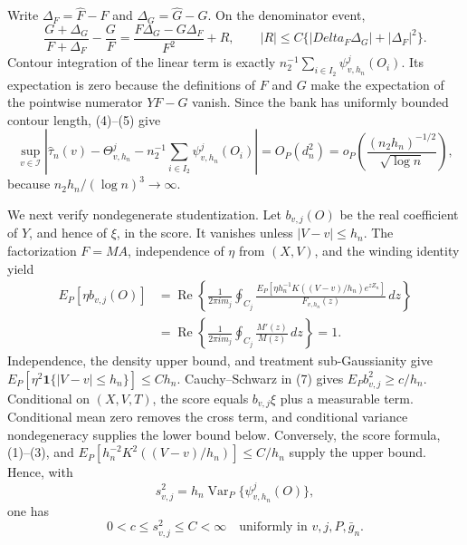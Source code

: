 Write \(\Delta_F=\widehat F-F\) and \(\Delta_G=\widehat G-G\).  On the denominator event,
\[
 \frac{G+\Delta_G}{F+\Delta_F}-\frac GF
 =\frac{F\Delta_G-G\Delta_F}{F^2}+R,
 \qquad |R|\le C\{|Delta_F\Delta_G|+|\Delta_F|^2\}. \tag{5}
\]
Contour integration of the linear term is exactly
\(n_2^{-1}\sum_{i\in I_2}\psi^j_{v,h_n}(O_i)\).  Its expectation is zero because the definitions of \(F\) and \(G\) make the expectation of the pointwise numerator \(YF-G\) vanish.  Since the bank has uniformly bounded contour length, (4)--(5) give
\[
 \sup_{v\in\mathcal I}\left|
 \widehat\tau_n(v)-\Theta^j_{v,h_n}
 -n_2^{-1}\sum_{i\in I_2}\psi^j_{v,h_n}(O_i)
 \right|
 =O_P(d_n^2)
 =o_P\!\left(\frac{(n_2h_n)^{-1/2}}{\sqrt{\log n}}\right), \tag{6}
\]
because \(n_2h_n/(\log n)^3\to\infty\).

We next verify nondegenerate studentization.  Let \(b_{v,j}(O)\) be the real coefficient of \(Y\), and hence of \(\xi\), in the score.  It vanishes unless \(|V-v|\le h_n\).  The factorization \(F=MA\), independence of \(\eta\) from \((X,V)\), and the winding identity yield
\[
 \begin{aligned}
 E_P[\eta b_{v,j}(O)]
 &=\operatorname{Re}\left\{\frac1{2\pi i m_j}\oint_{C_j}
 \frac{E_P[\eta h_n^{-1}K((V-v)/h_n)e^{zZ_n}]}{F_{v,h_n}(z)}\,dz\right\}\\
 &=\operatorname{Re}\left\{\frac1{2\pi i m_j}\oint_{C_j}\frac{M'(z)}{M(z)}\,dz\right\}=1. 
 \end{aligned} \tag{7}
\]
Independence, the density upper bound, and treatment sub-Gaussianity give
\(E_P[\eta^2\mathbf 1\{|V-v|\le h_n\}]\le Ch_n\).  Cauchy--Schwarz in (7) gives \(E_Pb_{v,j}^2\ge c/h_n\).  Conditional on \((X,V,T)\), the score equals \(b_{v,j}\xi\) plus a measurable term.  Conditional mean zero removes the cross term, and conditional variance nondegeneracy supplies the lower bound below.  Conversely, the score formula, (1)--(3), and
\(E_P[h_n^{-2}K^2((V-v)/h_n)]\le C/h_n\) supply the upper bound.  Hence, with
\[
 s_{v,j}^2=h_n\operatorname{Var}_P\{\psi^j_{v,h_n}(O)\},
\]
one has
\[
 0<c\le s_{v,j}^2\le C<\infty
 \quad\text{uniformly in }v,j,P,\bar g_n. \tag{8}
\]

